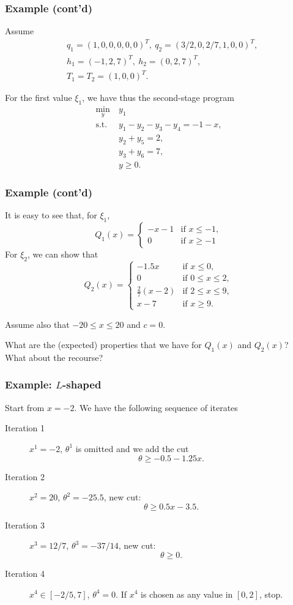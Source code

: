 \documentclass[aspectratio=169]{beamer}
\begin{document}
\begin{frame}
\frametitle{Example (cont'd)}

Assume
\begin{align*}
& q_1 = (1,0,0,0,0,0)^T,\ q_2 = (3/2, 0, 2/7, 1, 0, 0)^T, \\
& h_1 = (-1,2,7)^T,\ h_2 = (0,2,7)^T, \\
& T_1 = T_2 = (1,0,0)^T.
\end{align*}

\mbox{}

For the first value $\xi_1$, we have thus the second-stage program
\begin{align*}
\min_y\ & y_1 \\
\text{s.t. } & y_1 - y_2 - y_3 -y_4 = -1 - x, \\
& y_2 + y_5 = 2, \\
& y_3 + y_6 = 7, \\
& y \geq 0.
\end{align*}

\end{frame}

\begin{frame}
\frametitle{Example (cont'd)}

It is easy to see that, for $\xi_1$,
\[
Q_1(x) = \begin{cases}
-x-1 & \text{if } x \leq -1, \\ 0 & \text{if } x \geq -1
\end{cases}
\]
For $\xi_2$, we can show that
\[
Q_2(x) = \begin{cases}
-1.5x & \text{if } x \leq 0, \\
0 & \text{if } 0 \leq x \leq 2, \\
\frac{2}{7}(x-2) & \text{if } 2 \leq x \leq 9, \\
x - 7 & \text{if } x \geq 9.
\end{cases}
\]

Assume also that $-20 \leq x \leq 20$ and $c = 0$.

\mbox{}

What are the (expected) properties that we have for $Q_1(x)$ and
$Q_2(x)$?\\
What about the recourse?

\end{frame}

\begin{frame}
\frametitle{Example: $L$-shaped}

Start from $x = -2$. We have the following sequence of iterates
\begin{description}
\item[Iteration 1] $x^1 = -2$, $\theta^1$ is omitted and we add the cut
\[
\theta \geq -0.5 -1.25x.
\]
\item[Iteration 2] $x^2 = 20$, $\theta^2 = -25.5$, new cut:
\[
\theta \geq 0.5x - 3.5.
\]
\item[Iteration 3] $x^3 = 12/7$, $\theta^3 = -37/14$, new cut:
\[
\theta \geq 0.
\]
\item[Iteration 4] $x^4 \in [-2/5, 7]$, $\theta^4 = 0$.
If $x^4$ is chosen as any value in $[0,2]$, stop.
\end{description}

\end{frame}
\end{document}
